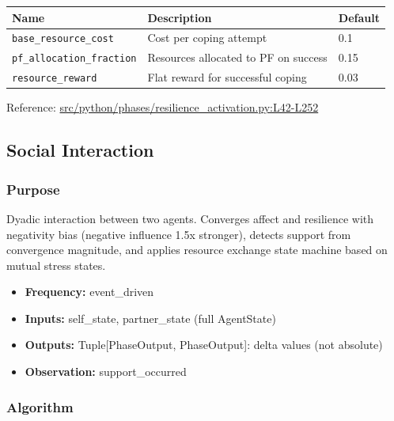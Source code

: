 \documentclass[
  letterpaper,
  DIV=11,
  numbers=noendperiod]{scrartcl}
\providecommand{\tightlist}{%
  \setlength{\itemsep}{0pt}\setlength{\parskip}{0pt}}
\newcommand{\trow}[3]{%
  \texttt{\allowbreak #1} & #2 & #3 \\
}
\begin{document}
\begin{tabularx}{\textwidth}{p{4.5cm}Xp{2cm}}
\toprule
\textbf{Name} & \textbf{Description} & \textbf{Default} \\
\midrule
\trow{base\_resource\_cost}{Cost per coping attempt}{0.1}
\trow{pf\_allocation\_fraction}{Resources allocated to PF on success}{0.15}
\trow{resource\_reward}{Flat reward for successful coping}{0.03}
\bottomrule
\end{tabularx}

Reference:
\href{https://github.com/namakala/abm-simulation/blob/84ff9b37fb0c569bef9f122e789d9c23a89348ec/src/python/phases/resilience_activation.py\#L42-L252}{src/python/phases/resilience\_activation.py:L42-L252}

\subsection{Social Interaction}\label{social-interaction}

\subsubsection{Purpose}\label{purpose-5}

Dyadic interaction between two agents. Converges affect and resilience
with negativity bias (negative influence 1.5x stronger), detects support
from convergence magnitude, and applies resource exchange state machine
based on mutual stress states.

\begin{itemize}
\tightlist
\item
  \textbf{Frequency:} event\_driven
\item
  \textbf{Inputs:} self\_state, partner\_state (full AgentState)
\item
  \textbf{Outputs:} Tuple{[}PhaseOutput, PhaseOutput{]}: delta values
  (not absolute)
\item
  \textbf{Observation:} support\_occurred
\end{itemize}

\subsubsection{Algorithm}\label{algorithm-3}
\end{document}
